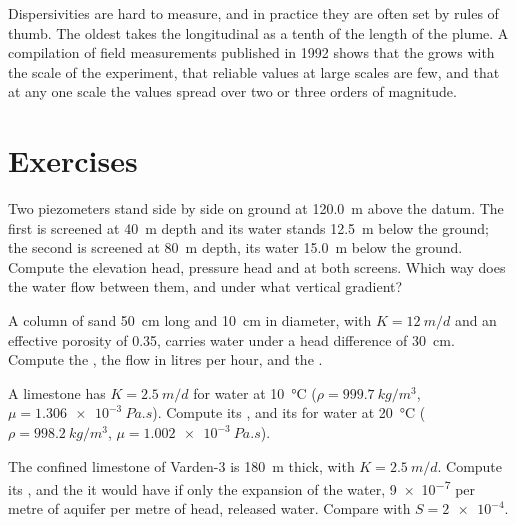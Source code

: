 Dispersivities are hard to measure, and in practice they are often set by
rules of thumb. The oldest takes the longitudinal  as a tenth of
the length of the plume. A compilation of field measurements published in
1992 shows that the  grows with the scale of the experiment,
that reliable values at large scales are few, and that at any one scale the
values spread over two or three orders of magnitude.

\section{Exercises}

\begin{exercise}[$\star$]\label{exo:b3:hydrogeology:1}
Two piezometers stand side by side on ground at \qty{120.0}{m} above the
datum. The first is screened at \qty{40}{m} depth and its water stands
\qty{12.5}{m} below the ground; the second is screened at \qty{80}{m}
depth, its water \qty{15.0}{m} below the ground. Compute the elevation
head, pressure head and  at both screens. Which way does the
water flow between them, and under what vertical gradient?
\end{exercise}

\begin{exercise}[$\star$]\label{exo:b3:hydrogeology:2}
A column of sand \qty{50}{cm} long and \qty{10}{cm} in diameter, with $K =
\qty{12}{m/d}$ and an effective porosity of 0.35, carries water under a
head difference of \qty{30}{cm}. Compute the , the flow
in litres per hour, and the .
\end{exercise}

\begin{exercise}[$\star$]\label{exo:b3:hydrogeology:3}
A limestone has $K = \qty{2.5}{m/d}$ for water at \qty{10}{\celsius}
($\rho = \qty{999.7}{kg/m^3}$, $\mu = \qty{1.306e-3}{Pa.s}$). Compute its
, and its  for water at
\qty{20}{\celsius} ($\rho = \qty{998.2}{kg/m^3}$, $\mu =
\qty{1.002e-3}{Pa.s}$).
\end{exercise}

\begin{exercise}[$\star$]\label{exo:b3:hydrogeology:4}
The confined limestone of Varden-3 is \qty{180}{m} thick, with $K =
\qty{2.5}{m/d}$. Compute its , and the  it would
have if only the expansion of the water, \num{9e-7} per metre of aquifer
per metre of head, released water. Compare with $S = \num{2e-4}$.
\end{exercise}

